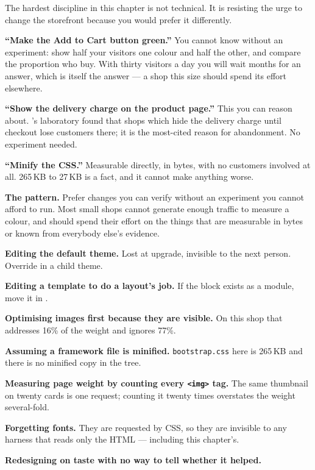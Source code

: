 The hardest discipline in this chapter is not technical. It is resisting the
urge to change the storefront because you would prefer it differently.

\begin{examplebox}
\textbf{``Make the Add to Cart button green.''} You cannot know without an
experiment: show half your visitors one colour and half the other, and compare
the proportion who buy. With thirty visitors a day you will wait months for an
answer, which is itself the answer --- a shop this size should spend its
effort elsewhere.

\smallskip
\textbf{``Show the delivery charge on the product page.''} This you can reason
about. 's laboratory found that shops which hide the delivery
charge until checkout lose customers there; it is the most-cited reason for
abandonment. No experiment needed.

\smallskip
\textbf{``Minify the CSS.''} Measurable directly, in bytes, with no customers
involved at all. 265\,KB to 27\,KB is a fact, and it cannot make anything
worse.

\smallskip
\textbf{The pattern.} Prefer changes you can verify without an experiment you
cannot afford to run. Most small shops cannot generate enough traffic to
measure a colour, and should spend their effort on the things that are
measurable in bytes or known from everybody else's evidence.
\end{examplebox}

\begin{pitfall}
\begin{tight}
  \item \textbf{Editing the default theme.} Lost at upgrade, invisible to the
        next person. Override in a child theme.
  \item \textbf{Editing a template to do a layout's job.} If the block exists
        as a module, move it in .
  \item \textbf{Optimising images first because they are visible.} On this shop
        that addresses 16\% of the weight and ignores 77\%.
  \item \textbf{Assuming a framework file is minified.} \texttt{bootstrap.css}
        here is 265\,KB and there is no minified copy in the tree.
  \item \textbf{Measuring page weight by counting every \texttt{<img>} tag.}
        The same thumbnail on twenty cards is one request; counting it twenty
        times overstates the weight several-fold.
  \item \textbf{Forgetting fonts.} They are requested by CSS, so they are
        invisible to any harness that reads only the HTML --- including this
        chapter's.
  \item \textbf{Redesigning on taste with no way to tell whether it helped.}
\end{tight}
\end{pitfall}

